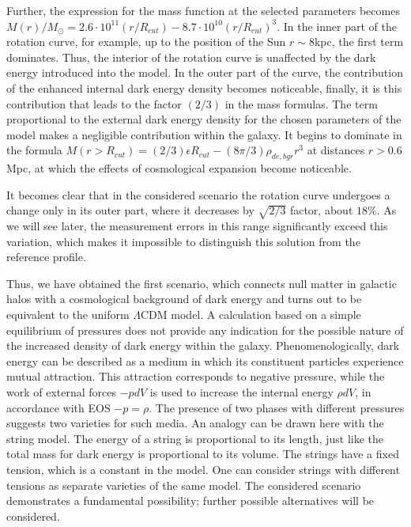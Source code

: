 \documentclass{article}
\begin{document}
Further, the expression for the mass function at the selected parameters becomes $ M (r) /M_\odot=2.6\cdot10^ {11} (r / R_ {cut}) - 8.7 \cdot10 ^ {10} (r / R_ {cut} ) ^ 3 $. In the inner part of the rotation curve, for example, up to the position of the Sun $ r \sim8 $kpc, the first term dominates. Thus, the interior of the rotation curve is unaffected by the dark energy introduced into the model. In the outer part of the curve, the contribution of the enhanced internal dark energy density becomes noticeable, finally, it is this contribution that leads to the factor $ (2/3) $ in the mass formulas. The term proportional to the external dark energy density for the chosen parameters of the model makes a negligible contribution within the galaxy. It begins to dominate in the formula $ M (r> R_ {cut}) = (2/3) \epsilon R_ {cut} - (8 \pi / 3) \rho_ {de, bgr} r ^ 3 $ at distances $ r > 0.6 $Mpc, at which the effects of cosmological expansion become noticeable.

It becomes clear that in the considered scenario the rotation curve undergoes a change only in its outer part, where it decreases by $ \sqrt {2/3} $ factor, about $ 18 \% $. As we will see later, the measurement errors in this range significantly exceed this variation, which makes it impossible to distinguish this solution from the reference profile.

Thus, we have obtained the first scenario, which connects null matter in galactic halos with a cosmological background of dark energy and turns out to be equivalent to the uniform $ \Lambda $CDM model. A calculation based on a simple equilibrium of pressures does not provide any indication for the possible nature of the increased density of dark energy within the galaxy. Phenomenologically, dark energy can be described as a medium in which its constituent particles experience mutual attraction. This attraction corresponds to negative pressure, while the work of external forces $ -pdV $ is used to increase the internal energy $ \rho dV $, in accordance with EOS $ -p = \rho $. The presence of two phases with different pressures suggests two varieties for such media. An analogy can be drawn here with the string model. The energy of a string is proportional to its length, just like the total mass for dark energy is proportional to its volume. The strings have a fixed tension, which is a constant in the model. One can consider strings with different tensions as separate varieties of the same model. The considered scenario demonstrates a fundamental possibility; further possible alternatives will be considered.
\end{document}
